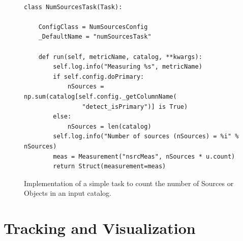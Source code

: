 \begin{figure}[!htp]
  \lstset{language=python}
  \begin{lstlisting}
  
class NumSourcesTask(Task):

    ConfigClass = NumSourcesConfig
    _DefaultName = "numSourcesTask"

    def run(self, metricName, catalog, **kwargs):
        self.log.info("Measuring %s", metricName)
        if self.config.doPrimary:
            nSources = np.sum(catalog[self.config._getColumnName(
                "detect_isPrimary")] is True)
        else:
            nSources = len(catalog)
        self.log.info("Number of sources (nSources) = %i" % nSources)
        meas = Measurement("nsrcMeas", nSources * u.count)
        return Struct(measurement=meas)    \end{lstlisting}
        
  \caption{Implementation of a simple task to count the number of Sources or Objects in an input catalog. }
  \label{fig:num_sources_task}
  \par\medskip
\end{figure}

\section{Tracking and Visualization} \label{sec:tracking}

